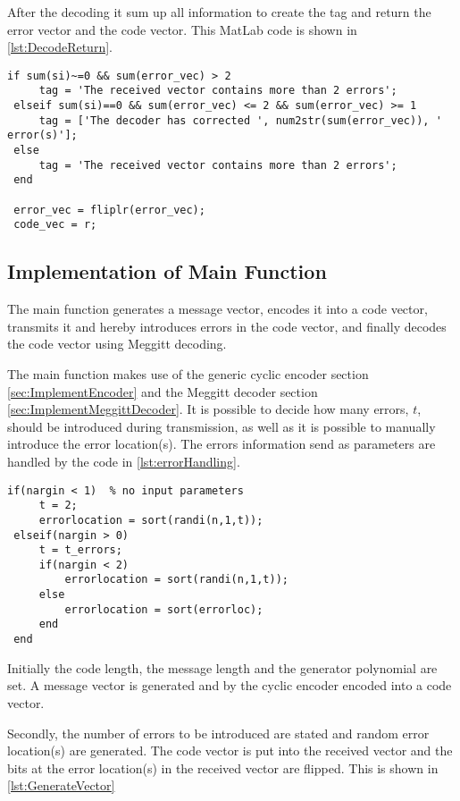 \documentclass[Main]{subfiles}
\begin{document}
After the decoding it sum up all information to create the tag and return the error vector and the code vector.
This MatLab code is shown in \codeTitle \ref{lst:DecodeReturn}.

\begin{lstlisting}[caption=Meggitt decode return, style=Code-Matlab, label=lst:DecodeReturn]
 if sum(si)~=0 && sum(error_vec) > 2
     tag = 'The received vector contains more than 2 errors';
 elseif sum(si)==0 && sum(error_vec) <= 2 && sum(error_vec) >= 1
     tag = ['The decoder has corrected ', num2str(sum(error_vec)), ' error(s)'];
 else
     tag = 'The received vector contains more than 2 errors';
 end
 
 error_vec = fliplr(error_vec);
 code_vec = r;
\end{lstlisting}

\subsection{Implementation of Main Function}
The main function generates a message vector, encodes it into a code vector, transmits it and hereby introduces errors in the code vector, and finally decodes the code vector using Meggitt decoding.

\noindent The main function makes use of the generic cyclic encoder section \ref{sec:ImplementEncoder} and the Meggitt decoder section \ref{sec:ImplementMeggittDecoder}. It is possible to decide how many errors, $t$, should be introduced during transmission, as well as it is possible to manually introduce the error location(s). The errors information send as parameters are handled by the code in \codeTitle \ref{lst:errorHandling}.

\begin{lstlisting}[caption=Error handling, style=Code-Matlab, label=lst:errorHandling]
 if(nargin < 1)  % no input parameters
     t = 2;
     errorlocation = sort(randi(n,1,t));
 elseif(nargin > 0)
     t = t_errors;
     if(nargin < 2)
         errorlocation = sort(randi(n,1,t));
     else
         errorlocation = sort(errorloc);
     end
 end
\end{lstlisting}

\noindent Initially the code length, the message length and the generator polynomial are set. A message vector is generated and by the cyclic encoder encoded into a code vector. 

\noindent Secondly, the number of errors to be introduced are stated and random error location(s) are generated. The code vector is put into the received vector and the bits at the error location(s) in the received vector are flipped. This is shown in \codeTitle \ref{lst:GenerateVector}
\end{document}
